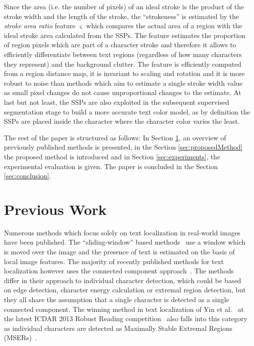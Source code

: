 \documentclass[conference]{IEEEtran}
\begin{document}
Since the area (i.e. the number of pixels) of an ideal stroke is the product of the stroke width and the length of the stroke, the ``strokeness'' is estimated by the \emph{stroke area ratio} feature $\varsigma$ which compares the actual area of a region with the ideal stroke area calculated from the SSPs. The feature estimates the proportion of region pixels which are part of a character stroke and therefore it allows to efficiently differentiate between text regions (regardless of how many characters they represent) and the background clutter. The feature is efficiently computed from a region distance map, it is invariant to scaling and rotation and it is more robust to noise than methods which aim to estimate a single stroke width value~\cite{MicrosoftCVPR} as small pixel changes do not cause unproportional changes to the estimate. At last but not least, the SSPs are also exploited in the subsequent supervised segmentation stage to build a more accurate text color model, as by definition the SSPs are placed inside the character where the character color varies the least.


The rest of the paper is structured as follows: In Section \ref{sec:previousWork}, an overview of previously published methods is presented, in the Section \ref{sec:proposedMethod} the proposed method is introduced and in Section \ref{sec:experiments}, the experimental evaluation is given. The paper is concluded in the Section \ref{sec:conclusion}.


\vspace{-5pt}
\section{Previous Work}

\label{sec:previousWork}
Numerous methods which focus solely on text localization in real-world images have been published. The ``sliding-window'' based methods~\cite{Lee-ICDAR2011} use a window which is moved over the image and the presence of text is estimated on the basis of local image features. The majority of recently published methods for text localization however uses the connected component approach~\cite{Neumann-CVPR2012, Neumann-ICDAR2013, MicrosoftCVPR,Yao-CVPR2012,Mishra-CVPR2012,kang2013orientation}. The methods differ in their approach to individual character detection, which could be based on edge detection, character energy calculation or extremal region detection, but they all share the assumption that a single character is detected as a single connected component. The winning method in text localization of Yin et al.~\cite{Yin-TPAMI2013} at the latest ICDAR 2013 Robust Reading competition~\cite{ICDAR2013} also falls into this category as individual characters are detected as Maximally Stable Extremal Regions (MSERs)~\cite{Matas-MSER}.
\end{document}
